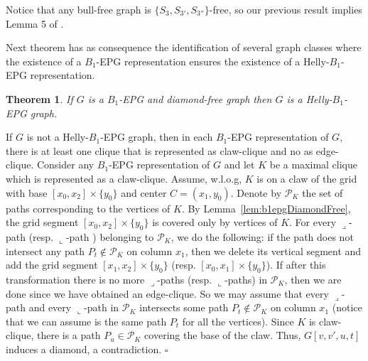 \documentclass[9pt]{entcs}
\newtheorem{teo}[thm]{Theorem}%
\begin{document}



Notice that any bull-free graph is $\{S_{3}, S_{3'}, S_{3''}\}$-free, so our previous result implies  Lemma 5 of  \cite{ries2009}.






Next theorem has as consequence the identification of several graph classes where the existence of a $B_1$-EPG representation ensures the existence of a Helly-$B_1$-EPG representation.


\begin{teo} \label{lem:b1DiamondFree}
 If $G$ is a $B_1$-EPG and diamond-free graph then $G$ is a Helly-$B_1$-EPG graph.
 \end{teo}

\begin{pf}
If $G$ is not a Helly-$B_1$-EPG graph, then in each $B_1$-EPG representation of $G$, there is at least one clique that is represented as claw-clique and no as edge-clique.  Consider any $B_1$-EPG  representation of $G$  and let $K$ be a maximal clique  which is represented as a claw-clique. Assume, w.l.o.g,  $K$ is on a claw of the grid with base $[x_0, x_2]\times\{y_0\}$ and center $C = (x_1, y_0)$. Denote by  $\mathcal{P}_K$ the set of paths corresponding to the vertices of $K$. 
 By Lemma~\ref{lem:b1epgDiamondFree},  %
the grid segment $[x_0, x_2]\times\{y_0\}$ is covered only by vertices of $K$. %
 For every ${\displaystyle \lrcorner}$-path %
 (resp. ${\displaystyle \llcorner}$-path 
 ) belonging to $\mathcal{P}_K$, we do the following: if %
 the path does not intersect any path $P_t \notin\mathcal{P}_K$ on column $x_1$, then we delete its vertical segment and add the grid segment $[x_1, x_2]\times\{y_0\}$ (resp. $[x_0, x_1]\times\{y_0\}$). If after this transformation there is no more ${\displaystyle \lrcorner}$-paths (resp. ${\displaystyle \llcorner}$-paths) in $\mathcal{P}_K$, then we are done since we have obtained an edge-clique. So we may assume that
 every ${\displaystyle \lrcorner}$-path   and every ${\displaystyle \llcorner}$-path  in $ \mathcal{P}_K$ intersects some path $P_t \notin \mathcal{P}_K$   on column $x_1$ (notice that we can assume is the same path $P_t$ for all the vertices). Since  $K$ is claw-clique,  there is a path $P_u \in \mathcal{P}_K$ covering the base of the claw. Thus, $G[v, v', u, t]$ induces a diamond,  a contradiction. \hfill  $\square$
\end{pf}  
\end{document}
